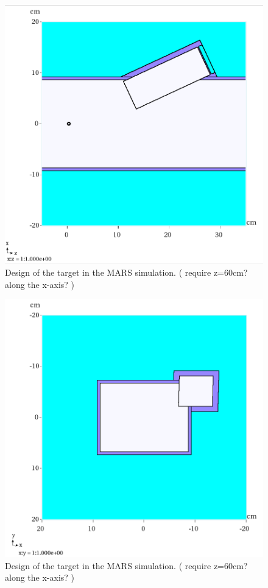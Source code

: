 \documentclass[a4paper,11pt]{article}
\begin{document}
\begin{figure}[t!]
  \begin{center}
    \includegraphics[width=1.0\columnwidth]{./figures/XZGeom-v6-Q1-y=6cm-Zoom.png}
    \caption{Design of the target in the MARS simulation. ( require z=60cm?along the x-axis? ) }
    \label{fig:MARSwindow}
  \end{center}
\end{figure}

\begin{figure}[t!]
  \begin{center}
    \includegraphics[width=1.0\columnwidth]{./figures/XYGeom-v6-Q1-z=22cm.png}
    \caption{Design of the target in the MARS simulation. ( require z=60cm?along the x-axis? ) }
    \label{fig:MARSXY}
  \end{center}
\end{figure}
\end{document}
